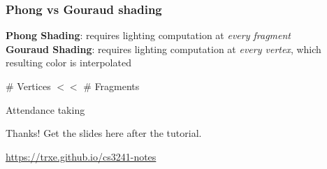 \documentclass{beamer}
\begin{document}
\begin{frame}
    \frametitle{Phong vs Gouraud shading}

    \textbf{Phong Shading}: requires lighting computation at \textit{every fragment}\\
    \textbf{Gouraud Shading}: requires lighting computation at \textit{every vertex}, which resulting color is interpolated\\

    \begin{tcolorbox}
        \# Vertices $<<$ \# Fragments
    \end{tcolorbox}

\end{frame}

\begin{frame}
    \AlegreyaExtraBold \LARGE
    Attendance taking
\end{frame}

\ThankYou
\begin{frame}
    Thanks! Get the slides here after the tutorial.\\
    \vspace{2em}
    \scalebox{3}{\faGithub}\par\bigskip
    \url{https://trxe.github.io/cs3241-notes}
\end{frame}
\end{document}
